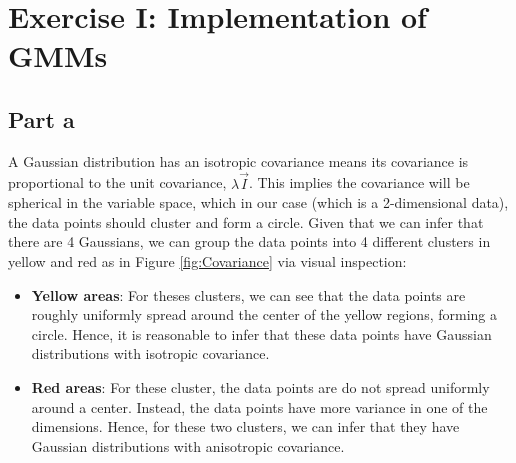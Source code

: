 \documentclass[12pt,twoside]{article}
\begin{document}



\section{Exercise I: Implementation of GMMs}
\subsection{Part a}
A Gaussian distribution has an isotropic covariance means its covariance is proportional to the unit covariance, $\lambda \vec{I}$. This implies the covariance will be spherical in the variable space, which in our case (which is a 2-dimensional data), the data points should cluster and form a circle. Given that we can infer that there are 4 Gaussians, we can group the data points into 4 different clusters in yellow and red as in Figure \ref{fig:Covariance} via visual inspection:

\begin{itemize}
	\item \textbf{Yellow areas}: For theses clusters, we can see that the data points are roughly uniformly spread around the center of the yellow regions, forming a circle. Hence, it is reasonable to infer that these 		data points have Gaussian distributions with isotropic covariance.
	\item \textbf{Red areas}: For these cluster, the data points are do not spread uniformly around a center. Instead, the data points have more variance in one of the dimensions. Hence, for these two clusters, we 		can infer that they have Gaussian distributions with anisotropic covariance.	
\end{itemize}
\end{document}
